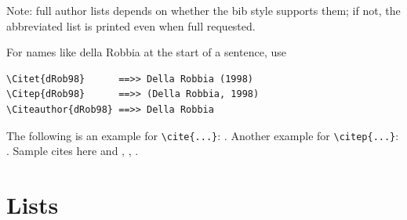 \documentclass[unnumsec,webpdf,contemporary,large]{oup-authoring-template}%
\theoremstyle{thmstyleone}%
\theoremstyle{thmstyletwo}%
\theoremstyle{thmstylethree}%
\begin{document}
\noindent
Note: full author lists depends on whether the bib style supports them;
if not, the abbreviated list is printed even when full requested.

\noindent
For names like della Robbia at the start of a sentence, use


{%
\begin{verbatim}
\Citet{dRob98}      ==>> Della Robbia (1998)
\Citep{dRob98}      ==>> (Della Robbia, 1998)
\Citeauthor{dRob98} ==>> Della Robbia
\end{verbatim}}


\noindent
The following is an example for \verb+\cite{...}+: \cite{rahman2019centroidb}. Another example for \verb+\citep{...}+: \citep{bahdanau2014neural,imboden2018cardiorespiratory,motiian2017unified,american2013acsm,murphy2012machine,ji20123d}.
Sample cites here \cite{krizhevsky2012imagenet,horvath2018dna} and \cite{pyrkov2018quantitative}, \cite{wang2018face}, \cite{lecun2015deep,zhang2018fine,ravi2016deep}.


\section{Lists}\label{sec9}
\end{document}
